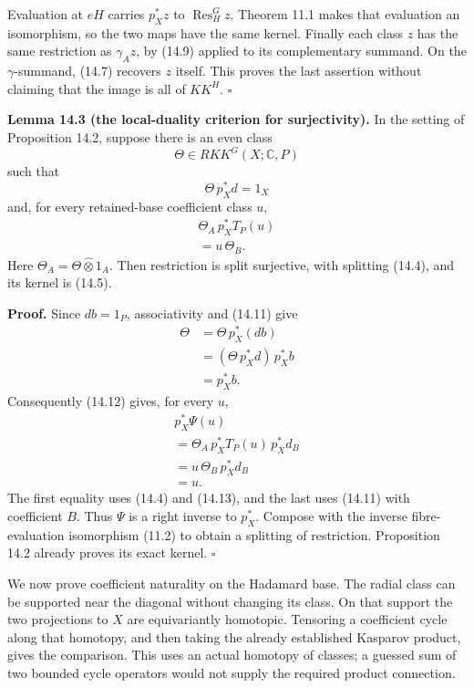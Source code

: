 \documentclass[
  11pt,
]{article}
\begin{document}
Evaluation at \(eH\) carries \(p_X^*z\) to \(\operatorname{Res}_H^G z\).
Theorem 11.1 makes that evaluation an isomorphism, so the two maps have
the same kernel. Finally each class \(z\) has the same restriction as
\(\gamma_Az\), by (14.9) applied to its complementary summand. On the
\(\gamma\)-summand, (14.7) recovers \(z\) itself. This proves the last
assertion without claiming that the image is all of \(KK^H\).
\(\square\)

\textbf{Lemma 14.3 (the local-duality criterion for surjectivity).} In
the setting of Proposition 14.2, suppose there is an even class \[
\Theta\in RKK^G(X;\mathbb C,P)
\tag{14.10}
\] such that \[
\Theta\,p_X^*d=1_X
\tag{14.11}
\] and, for every retained-base coefficient class \(u\), \[
\begin{gathered}
\Theta_A\,p_X^*T_{P}(u)\\
=u\,\Theta_B.
\end{gathered}
\tag{14.12}
\] Here \(\Theta_A=\Theta\widehat\otimes1_A\). Then restriction is split
surjective, with splitting (14.4), and its kernel is (14.5).

\textbf{Proof.} Since \(db=1_{P}\), associativity and (14.11) give \[
\begin{aligned}
\Theta&=\Theta\,p_X^*(db)\\
      &=(\Theta\,p_X^*d)\,p_X^*b\\
      &=p_X^*b.
\end{aligned}
\tag{14.13}
\] Consequently (14.12) gives, for every \(u\), \[
\begin{gathered}
p_X^*\Psi(u)\\
=\Theta_A\,p_X^*T_{P}(u)\,p_X^*d_B\\
=u\,\Theta_B\,p_X^*d_B\\
=u.
\end{gathered}
\tag{14.14}
\] The first equality uses (14.4) and (14.13), and the last uses (14.11)
with coefficient \(B\). Thus \(\Psi\) is a right inverse to \(p_X^*\).
Compose with the inverse fibre-evaluation isomorphism (11.2) to obtain a
splitting of restriction. Proposition 14.2 already proves its exact
kernel. \(\square\)

We now prove coefficient naturality on the Hadamard base. The radial
class can be supported near the diagonal without changing its class. On
that support the two projections to \(X\) are equivariantly homotopic.
Tensoring a coefficient cycle along that homotopy, and then taking the
already established Kasparov product, gives the comparison. This uses an
actual homotopy of classes; a guessed sum of two bounded cycle operators
would not supply the required product connection.
\end{document}
